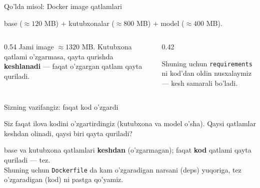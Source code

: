 \documentclass[aspectratio=169,11pt]{beamer}
\begin{document}
\begin{frame}{Qo'lda misol: Docker image qatlamlari}
  \begin{tcolorbox}[defbox,title={Image = qatlamlar yig'indisi}]
    \small base ($\approx 120$ MB) $+$ kutubxonalar ($\approx 800$ MB) $+$ model ($\approx 400$ MB).
  \end{tcolorbox}
  \vspace{0.2em}
  \begin{columns}[T]
    \begin{column}{0.54\textwidth}
      \footnotesize
      Jami image $\approx 1320$ MB. Kutubxona qatlami o'zgarmasa, qayta qurishda
      \textbf{keshlanadi} --- faqat o'zgargan qatlam qayta quriladi.
    \end{column}
    \begin{column}{0.42\textwidth}
      \begin{tcolorbox}[okbox,top=2pt,bottom=2pt]
        \footnotesize
        Shuning uchun \texttt{requirements} ni kod'dan oldin nusxalaymiz ---
        kesh samarali bo'ladi.
      \end{tcolorbox}
    \end{column}
  \end{columns}
\end{frame}

\begin{frame}{Sizning vazifangiz: faqat kod o'zgardi}
  \begin{tcolorbox}[warnbox,title=Savol --- 60 soniya]
    \small
    Siz faqat ilova kodini o'zgartirdingiz (kutubxona va model o'sha). Qaysi
    qatlamlar keshdan olinadi, qaysi biri qayta quriladi?
  \end{tcolorbox}
  \pause
  \begin{tcolorbox}[okbox,title=Javob]
    \small
    base va kutubxona qatlamlari \textbf{keshdan} (o'zgarmagan); faqat
    \textbf{kod} qatlami qayta quriladi --- tez.\\[3pt]
    \footnotesize Shuning uchun \texttt{Dockerfile} da kam o'zgaradigan narsani
    (deps) yuqoriga, tez o'zgaradigan (kod) ni pastga qo'yamiz.
  \end{tcolorbox}
\end{frame}
\end{document}
